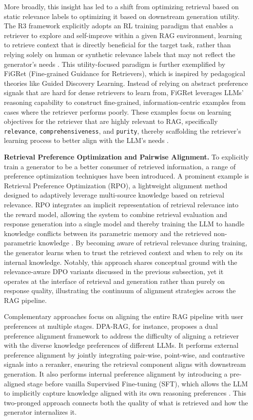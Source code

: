 \documentclass[11pt]{article}
\begin{document}
More broadly, this insight has led to a shift from optimizing retrieval based on static relevance labels to optimizing it based on downstream generation utility. The R3 framework explicitly adopts an RL training paradigm that enables a retriever to explore and self-improve within a given RAG environment, learning to retrieve context that is directly beneficial for the target task, rather than relying solely on human or synthetic relevance labels that may not reflect the generator's needs \cite{ref276}. This utility-focused paradigm is further exemplified by FiGRet (Fine-grained Guidance for Retrievers), which is inspired by pedagogical theories like Guided Discovery Learning. Instead of relying on abstract preference signals that are hard for dense retrievers to learn from, FiGRet leverages LLMs' reasoning capability to construct fine-grained, information-centric examples from cases where the retriever performs poorly. These examples focus on learning objectives for the retriever that are highly relevant to RAG, specifically \texttt{relevance}, \texttt{comprehensiveness}, and \texttt{purity}, thereby scaffolding the retriever's learning process to better align with the LLM's needs \cite{ref277}.

\textbf{Retrieval Preference Optimization and Pairwise Alignment.} To explicitly train a generator to be a better consumer of retrieved information, a range of preference optimization techniques have been introduced. A prominent example is Retrieval Preference Optimization (RPO), a lightweight alignment method designed to adaptively leverage multi-source knowledge based on retrieval relevance. RPO integrates an implicit representation of retrieval relevance into the reward model, allowing the system to combine retrieval evaluation and response generation into a single model and thereby training the LLM to handle knowledge conflicts between its parametric memory and the retrieved non-parametric knowledge \cite{ref258}. By becoming aware of retrieval relevance during training, the generator learns when to trust the retrieved context and when to rely on its internal knowledge. Notably, this approach shares conceptual ground with the relevance-aware DPO variants discussed in the previous subsection, yet it operates at the interface of retrieval and generation rather than purely on response quality, illustrating the continuum of alignment strategies across the RAG pipeline.

Complementary approaches focus on aligning the entire RAG pipeline with user preferences at multiple stages. DPA-RAG, for instance, proposes a dual preference alignment framework to address the difficulty of aligning a retriever with the diverse knowledge preferences of different LLMs. It performs external preference alignment by jointly integrating pair-wise, point-wise, and contrastive signals into a reranker, ensuring the retrieval component aligns with downstream generation. It also performs internal preference alignment by introducing a pre-aligned stage before vanilla Supervised Fine-tuning (SFT), which allows the LLM to implicitly capture knowledge aligned with its own reasoning preferences \cite{ref278}. This two-pronged approach connects both the quality of what is retrieved and how the generator internalizes it.
\end{document}
